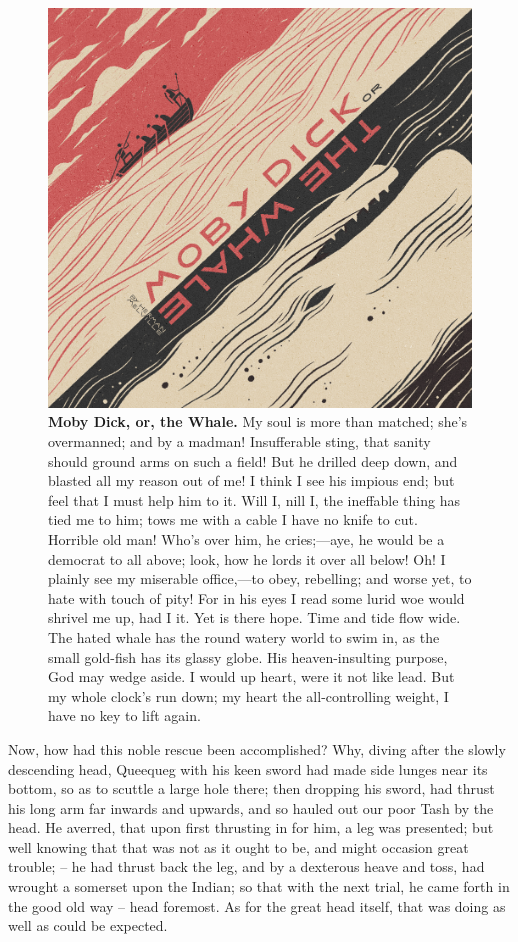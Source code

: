 \documentclass{article}
\begin{document}
\begin{figure}[!htp]
  \begin{center}
    \includegraphics{moby-dick-done}
    \caption{
        \textbf{Moby Dick, or, the Whale.}
My soul is more than matched; she's overmanned; and by a madman! Insufferable sting, that sanity should ground arms on such a field! But he drilled deep down, and blasted all my reason out of me! I think I see his impious end; but feel that I must help him to it. Will I, nill I, the ineffable thing has tied me to him; tows me with a cable I have no knife to cut. Horrible old man! Who's over him, he cries;—aye, he would be a democrat to all above; look, how he lords it over all below! Oh! I plainly see my miserable office,—to obey, rebelling; and worse yet, to hate with touch of pity! For in his eyes I read some lurid woe would shrivel me up, had I it. Yet is there hope. Time and tide flow wide. The hated whale has the round watery world to swim in, as the small gold-fish has its glassy globe. His heaven-insulting purpose, God may wedge aside. I would up heart, were it not like lead. But my whole clock's run down; my heart the all-controlling weight, I have no key to lift again. 
    }
  \end{center}
\end{figure}

Now, how had this noble rescue been accomplished? Why, diving after the slowly descending head, Queequeg with his keen sword had made side lunges near its bottom, so as to scuttle a large hole there; then dropping his sword, had thrust his long arm far inwards and upwards, and so hauled out our poor Tash by the head. He averred, that upon first thrusting in for him, a leg was presented; but well knowing that that was not as it ought to be, and might occasion great trouble; -- he had thrust back the leg, and by a dexterous heave and toss, had wrought a somerset upon the Indian; so that with the next trial, he came forth in the good old way -- head foremost. As for the great head itself, that was doing as well as could be expected.
\end{document}
